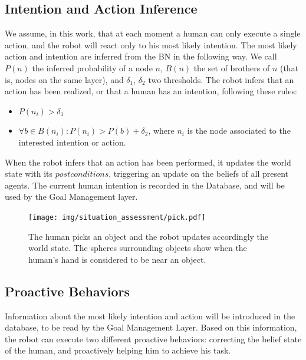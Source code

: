 \subsection{Intention and Action Inference}
\label{sec:situation_assessment-intention and action inference}
We assume, in this work, that at each moment a human can only execute a single action, and the robot will react only to his most likely intention. The most likely action and intention are inferred from the BN in the following way. We call $P(n)$ the inferred probability of a node $n$, $B(n)$ the set of brothers of $n$ (that is, nodes on the same layer), and $\delta_1$, $\delta_2$ two thresholds. The robot infers that an action has been realized, or that a human has an intention, following these rules: 
\begin{itemize}
\item  \(P(n_i)>\delta_1\) 
\item  \(\forall b \in B(n_i): P(n_i)>P(b)+\delta_2\), where $n_i$ is the node associated to the interested intention or action.
\end{itemize}

When the robot infers that an action has been performed, it updates the world state with its $postconditions$, triggering an update on the beliefs of all present agents. The current human intention is recorded in the Database, and will be used by the Goal Management layer.

 \begin{figure}[ht!]
	\centering
	\texttt{[image: img/situation\_assessment/pick.pdf]}
	\caption[Actions and world update]{The human picks an object and the robot updates accordingly the world state. The spheres surrounding objects show when the human's hand is considered to be near an object.}
	\label{fig:situation_assessment-pick}
\end{figure}


\subsection{Proactive Behaviors}
\label{subsec:situation_assessment-proactive_behaviors}
Information about the most likely intention and action will be introduced in the database, to be read by the Goal Management Layer. Based on this information, the robot can execute two different proactive behaviors: correcting the belief state of the human, and proactively helping him to achieve his task.

